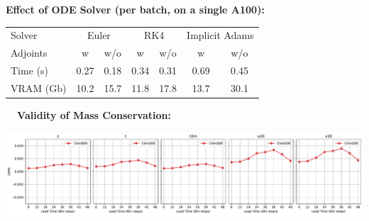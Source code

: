 \documentclass[landscape,a1paper,fontscale=0.424]{baposter}
\begin{document}
\begin{poster}
{        \begin{minipage}[t]{0.48\textwidth}
            \vspace{0.5em}
            \textbf{\color{blue}Effect of ODE Solver (per batch, on a single A100):}\\[0.2em]
            \begin{tabular}{lcccccc}
                \hline
                Solver    & \multicolumn{2}{c}{Euler}                            & \multicolumn{2}{c}{RK4}                              & \multicolumn{2}{c}{Implicit Adams}                                                                                                                                                                                        \\
                Adjoints  & w                                                    & w/o                                                  & w                                                    & w/o                                                  & w                                                    & w/o                                                  \\
                \hline
                Time (s)  & {\cellcolor[HTML]{FEDDBC}} \color[HTML]{000000} 0.27 & {\cellcolor[HTML]{FFF5EB}} \color[HTML]{000000} 0.18 & {\cellcolor[HTML]{FDBF86}} \color[HTML]{000000} 0.34 & {\cellcolor[HTML]{FDCFA0}} \color[HTML]{000000} 0.31 & {\cellcolor[HTML]{7F2704}} \color[HTML]{F1F1F1} 0.69 & {\cellcolor[HTML]{FA8532}} \color[HTML]{F1F1F1} 0.45 \\
                VRAM (Gb) & {\cellcolor[HTML]{FFF5EB}} \color[HTML]{000000} 10.2 & {\cellcolor[HTML]{FDC997}} \color[HTML]{000000} 15.7 & {\cellcolor[HTML]{FEECD9}} \color[HTML]{000000} 11.8 & {\cellcolor[HTML]{FDAD69}} \color[HTML]{000000} 17.8 & {\cellcolor[HTML]{FEDDBC}} \color[HTML]{000000} 13.7 & {\cellcolor[HTML]{7F2704}} \color[HTML]{F1F1F1} 30.1 \\
                \hline
            \end{tabular}
        \end{minipage}\hfill
        \begin{minipage}[t]{0.5\textwidth}
            \vspace{0.5em}
            \textbf{\color{blue}~~Validity of Mass Conservation:}
            \vspace{-0.5em}
            \begin{center}
                \includegraphics[width=\textwidth]{mass_conservation.pdf}

\end{center}
\end{minipage}}
\end{poster}
\end{document}
